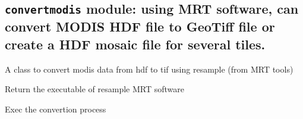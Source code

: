 \documentclass[a4paper,11pt,oneside]{sphinxmanual}
\begin{document}
\subsection{\texttt{convertmodis} module: using MRT software, can convert MODIS HDF file to GeoTiff file or create a HDF mosaic file for several tiles.}
\label{pymodis/pymodis:convertmodis-module-using-mrt-software-can-convert-modis-hdf-file-to-geotiff-file-or-create-a-hdf-mosaic-file-for-several-tiles}\label{pymodis/pymodis:module-pymodis.convertmodis}

\begin{fulllineitems}
\label{pymodis/pymodis:pymodis.convertmodis.convertModis}
A class to convert modis data from hdf to tif using resample
(from MRT tools)

\begin{fulllineitems}
\label{pymodis/pymodis:pymodis.convertmodis.convertModis.executable}
Return the executable of resample MRT software

\end{fulllineitems}


\begin{fulllineitems}
\label{pymodis/pymodis:pymodis.convertmodis.convertModis.run}
Exec the convertion process

\end{fulllineitems}


\end{fulllineitems}

\end{document}
